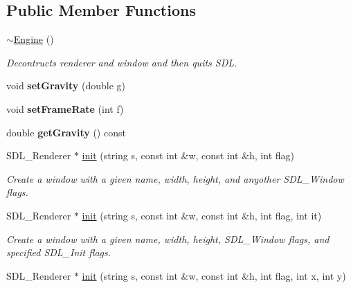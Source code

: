 \subsection*{Public Member Functions}
\begin{DoxyCompactItemize}
\item 
\hyperlink{classEngine_a8ef7030a089ecb30bbfcb9e43094717a}{$\sim$\+Engine} ()\hypertarget{classEngine_a8ef7030a089ecb30bbfcb9e43094717a}{}\label{classEngine_a8ef7030a089ecb30bbfcb9e43094717a}

\begin{DoxyCompactList}\small\item\em Decontructs renderer and window and then quits S\+DL. \end{DoxyCompactList}\item 
void {\bfseries set\+Gravity} (double g)\hypertarget{classEngine_ac2dab34eea67e7a2c006945ee71a9e42}{}\label{classEngine_ac2dab34eea67e7a2c006945ee71a9e42}

\item 
void {\bfseries set\+Frame\+Rate} (int f)\hypertarget{classEngine_a834148373d85dfc947ec3fcb366f25e6}{}\label{classEngine_a834148373d85dfc947ec3fcb366f25e6}

\item 
double {\bfseries get\+Gravity} () const \hypertarget{classEngine_ae0228c54bc903edc9cc149213b121b65}{}\label{classEngine_ae0228c54bc903edc9cc149213b121b65}

\item 
S\+D\+L\+\_\+\+Renderer $\ast$ \hyperlink{classEngine_af02c5fcfad817c5c8bc0a3cacfd9d4f8}{init} (string s, const int \&w, const int \&h, int flag)\hypertarget{classEngine_af02c5fcfad817c5c8bc0a3cacfd9d4f8}{}\label{classEngine_af02c5fcfad817c5c8bc0a3cacfd9d4f8}

\begin{DoxyCompactList}\small\item\em Create a window with a given name, width, height, and anyother S\+D\+L\+\_\+\+Window flags. \end{DoxyCompactList}\item 
S\+D\+L\+\_\+\+Renderer $\ast$ \hyperlink{classEngine_aca16d18226665d75acad41b48a8da989}{init} (string s, const int \&w, const int \&h, int flag, int it)\hypertarget{classEngine_aca16d18226665d75acad41b48a8da989}{}\label{classEngine_aca16d18226665d75acad41b48a8da989}

\begin{DoxyCompactList}\small\item\em Create a window with a given name, width, height, S\+D\+L\+\_\+\+Window flags, and specified S\+D\+L\+\_\+\+Init flags. \end{DoxyCompactList}\item 
S\+D\+L\+\_\+\+Renderer $\ast$ \hyperlink{classEngine_a4f80e210f2ae48208eed4ad17c309120}{init} (string s, const int \&w, const int \&h, int flag, int x, int y)\hypertarget{classEngine_a4f80e210f2ae48208eed4ad17c309120}{}\label{classEngine_a4f80e210f2ae48208eed4ad17c309120}


\end{DoxyCompactItemize}
